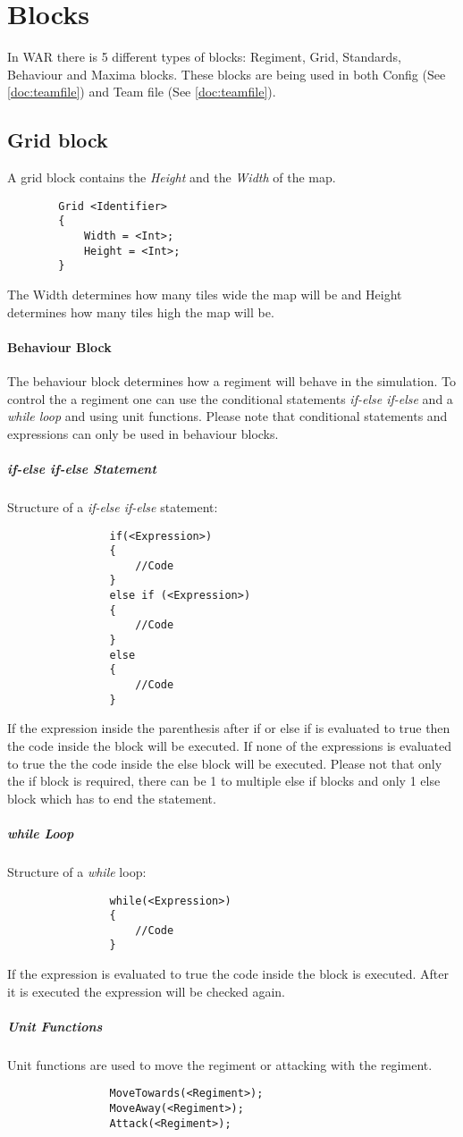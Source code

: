 \section{Blocks}
\label{doc:blocks}
	In WAR there is 5 different types of blocks: Regiment, Grid, Standards, Behaviour and Maxima blocks. 
	These blocks are being used in both Config (See \ref{doc:teamfile}) and Team file (See \ref{doc:teamfile}).
	\subsection{Grid block}
		A grid block contains the {\it Height} and the {\it Width }of the map.
		\begin{verbatim}
		Grid <Identifier>
		{
			Width = <Int>;
			Height = <Int>;
		}
		\end{verbatim}	
		The Width determines how many tiles wide the map will be and Height determines how many tiles high the map will be.
	\paragraph{Behaviour Block}
		The behaviour block determines how a regiment will behave in the simulation. To control the a regiment one can 
		use the conditional statements {\it if-else if-else} and a {\it while loop} and using unit functions. Please note that 
		conditional statements and expressions can only be used in behaviour blocks.
		\subparagraph{if-else if-else Statement}
			Structure of a {\it if-else if-else} statement: \\
			\begin{verbatim}
				if(<Expression>)
				{
					//Code
				}
				else if (<Expression>)
				{
					//Code
				}
				else
				{
					//Code
				}
			\end{verbatim}
			If the expression inside the parenthesis after if or else if is evaluated to true then the code inside the block will be executed.
			If none of the expressions is evaluated to true the the code inside the else block will be executed. Please not that only the if block
			is required, there can be 1 to multiple else if blocks and only 1 else block which has to end the statement. \\
		\subparagraph{while Loop}
			Structure of a {\it while} loop: \\			
			\begin{verbatim}
				while(<Expression>)
				{
					//Code
				}
			\end{verbatim}
			If the expression is evaluated to true the code inside the block is executed. After it is executed the expression will be checked again.
		\subparagraph{Unit Functions}
			Unit functions are used to move the regiment or attacking with the regiment.
			\begin{verbatim}
				MoveTowards(<Regiment>);
				MoveAway(<Regiment>);
				Attack(<Regiment>);
			\end{verbatim}
